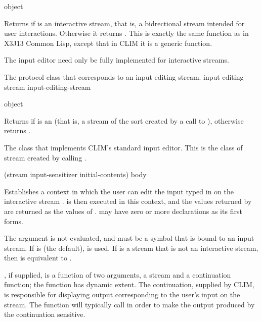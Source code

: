  {object}

Returns  if  is an interactive stream, that is, a
bidrectional stream intended for user interactions.  Otherwise it returns
.  This is exactly the same function as in X3J13 Common Lisp,
except that in CLIM it is a generic function.

The input editor need only be fully implemented for interactive streams.


The protocol class that corresponds to an input editing stream.
 {input editing stream} {input-editing-stream}

 {object}

Returns  if  is an  (that is,
a stream of the sort created by a call to ), otherwise
returns .


The class that implements CLIM's standard input editor.  This is the class of
stream created by calling .

\Mutable


 {(\optional stream 
                                 \key input-sensitizer initial-contents)
                                \body body}

Establishes a context in which the user can edit the input typed in on the
interactive stream .   is then executed in this context,
and the values returned by  are returned as the values of
.   may have zero or more declarations as its
first forms.

The  argument is not evaluated, and must be a symbol that is bound
to an input stream.  If  is  (the default),  is
used.  If  is a stream that is not an interactive stream, then
 is equivalent to .

, if supplied, is a function of two arguments, a stream
and a continuation function; the function has dynamic extent.  The continuation,
supplied by CLIM, is responsible for displaying output corresponding to the
user's input on the stream.  The  function will typically call
 in order to make the output produced by the
continuation sensitive.

